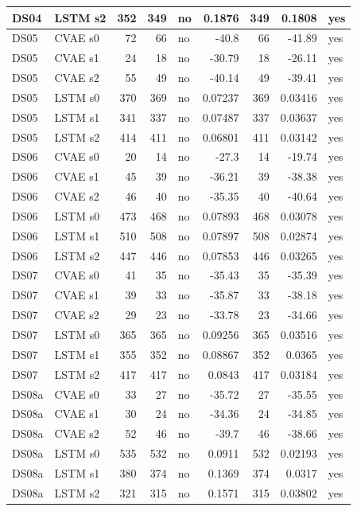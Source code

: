 \documentclass[10pt]{article}
\begin{document}
{\begin{longtable}{llrrlrrrl}
DS04 & LSTM s2 & 352 & 349 & no & 0.1876 & 349 & 0.1808 & yes \\
\midrule
DS05 & CVAE s0 & 72 & 66 & no & -40.8 & 66 & -41.89 & yes \\
DS05 & CVAE s1 & 24 & 18 & no & -30.79 & 18 & -26.11 & yes \\
DS05 & CVAE s2 & 55 & 49 & no & -40.14 & 49 & -39.41 & yes \\
DS05 & LSTM s0 & 370 & 369 & no & 0.07237 & 369 & 0.03416 & yes \\
DS05 & LSTM s1 & 341 & 337 & no & 0.07487 & 337 & 0.03637 & yes \\
DS05 & LSTM s2 & 414 & 411 & no & 0.06801 & 411 & 0.03142 & yes \\
\midrule
DS06 & CVAE s0 & 20 & 14 & no & -27.3 & 14 & -19.74 & yes \\
DS06 & CVAE s1 & 45 & 39 & no & -36.21 & 39 & -38.38 & yes \\
DS06 & CVAE s2 & 46 & 40 & no & -35.35 & 40 & -40.64 & yes \\
DS06 & LSTM s0 & 473 & 468 & no & 0.07893 & 468 & 0.03078 & yes \\
DS06 & LSTM s1 & 510 & 508 & no & 0.07897 & 508 & 0.02874 & yes \\
DS06 & LSTM s2 & 447 & 446 & no & 0.07853 & 446 & 0.03265 & yes \\
\midrule
DS07 & CVAE s0 & 41 & 35 & no & -35.43 & 35 & -35.39 & yes \\
DS07 & CVAE s1 & 39 & 33 & no & -35.87 & 33 & -38.18 & yes \\
DS07 & CVAE s2 & 29 & 23 & no & -33.78 & 23 & -34.66 & yes \\
DS07 & LSTM s0 & 365 & 365 & no & 0.09256 & 365 & 0.03516 & yes \\
DS07 & LSTM s1 & 355 & 352 & no & 0.08867 & 352 & 0.0365 & yes \\
DS07 & LSTM s2 & 417 & 417 & no & 0.0843 & 417 & 0.03184 & yes \\
\midrule
DS08a & CVAE s0 & 33 & 27 & no & -35.72 & 27 & -35.55 & yes \\
DS08a & CVAE s1 & 30 & 24 & no & -34.36 & 24 & -34.85 & yes \\
DS08a & CVAE s2 & 52 & 46 & no & -39.7 & 46 & -38.66 & yes \\
DS08a & LSTM s0 & 535 & 532 & no & 0.0911 & 532 & 0.02193 & yes \\
DS08a & LSTM s1 & 380 & 374 & no & 0.1369 & 374 & 0.0317 & yes \\
DS08a & LSTM s2 & 321 & 315 & no & 0.1571 & 315 & 0.03802 & yes \\

\end{longtable}}
\end{document}
